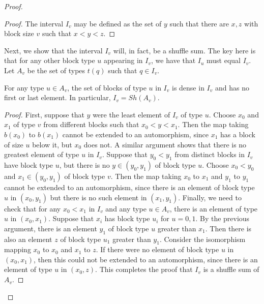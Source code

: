 \documentclass[11pt]{amsart}
\theoremstyle{definition}
\begin{document}
\begin{proof}
\begin{proof}
The interval $I_v$ may be defined as the set of $y$ such that there are $x,z$ with block size $v$ such that $x < y < z$.
\end{proof} 



Next, we show that the interval $I_v$ will, in fact, be a shuffle sum. The key here is that for any other block type $u$ appearing in $I_v$, we have that $I_u$ must equal $I_v$. 
Let $A_v$ be the set of types $t(q)$ such that $q \in I_v$. 
\begin{claim}\label{claim:spHomShuffle}
    For any type $u \in A_v$, the set of blocks of type $u$ in $I_v$ is dense in $I_v$ and has no first or last element.
    In particular, $I_v=Sh(A_v)$.
\end{claim}

\begin{proof}
     First, suppose that $y$ were the least element of $I_v$ of type $u$. Choose $x_0$ and $x_1$ of type $v$ from different blocks such that $x_0 < y < x_1$. Then the map taking $b(x_0)$ to $b(x_1)$ cannot be extended to an automorphism, since $x_1$ has a block of size $u$ below it, but $x_0$ does not. A similar argument shows that there is no greatest element of type $u$ in $I_v$.
     Suppose that $y_0 < y_1$ from distinct blocks in $I_v$ have block type $u$, but there is no $y \in (y_0,y_1)$ of block type $u$. Choose $x_0 < y_0$ and $x_1 \in (y_0,y_1)$ of block type $v$. Then the map taking $x_0$ to $x_1$ and $y_1$ to $y_1$ cannot be extended to an automorphism, since there is an element of block type $u$ in $(x_0,y_1)$ but there is no such element in $(x_1,y_1)$. Finally, we need to check that for any $x_0 < x_1$ in $I_v$ and any type $u \in A_v$, there is an element of type $u$ in $(x_0,x_1)$.  Suppose that $x_i$ has block type $u_i$ for $u=0,1$. By the previous argument, there is an element $y_1$ of block type $u$ greater than $x_1$. Then there is also an element $z$ of block type $u_1$ greater than $y_1$. Consider the isomorphism mapping $x_0$ to $x_0$ and $x_1$ to $z$. If there were no element of block type $u$ in $(x_0,x_1)$, then this could not be extended to an automorphism, since there is an element of type $u$ in $(x_0,z)$. This completes the proof that $I_v$ is a shuffle sum of $A_v$.
\end{proof}


\end{proof}
\end{document}
